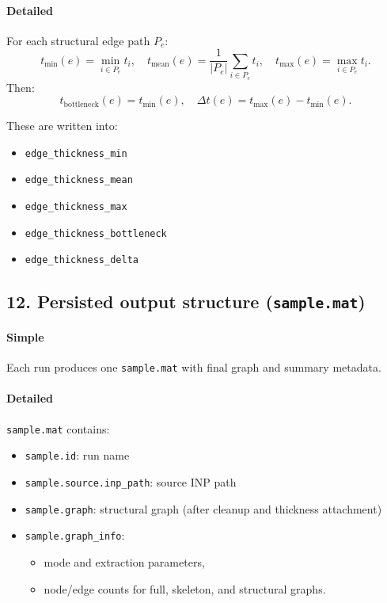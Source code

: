 \documentclass[11pt]{article}
\begin{document}
\paragraph{Detailed}
For each structural edge path \(P_e\):
\[
t_{\min}(e)=\min_{i\in P_e} t_i,\quad
t_{\text{mean}}(e)=\frac{1}{|P_e|}\sum_{i\in P_e} t_i,\quad
t_{\max}(e)=\max_{i\in P_e} t_i.
\]
Then:
\[
t_{\text{bottleneck}}(e)=t_{\min}(e),\quad
\Delta t(e)=t_{\max}(e)-t_{\min}(e).
\]

These are written into:
\begin{itemize}
  \item \texttt{edge\_thickness\_min}
  \item \texttt{edge\_thickness\_mean}
  \item \texttt{edge\_thickness\_max}
  \item \texttt{edge\_thickness\_bottleneck}
  \item \texttt{edge\_thickness\_delta}
\end{itemize}

\subsection*{12. Persisted output structure (\texttt{sample.mat})}
\paragraph{Simple}
Each run produces one \texttt{sample.mat} with final graph and summary metadata.

\paragraph{Detailed}
\texttt{sample.mat} contains:
\begin{itemize}
  \item \texttt{sample.id}: run name
  \item \texttt{sample.source.inp\_path}: source INP path
  \item \texttt{sample.graph}: structural graph (after cleanup and thickness attachment)
  \item \texttt{sample.graph\_info}:
  \begin{itemize}
    \item mode and extraction parameters,
    \item node/edge counts for full, skeleton, and structural graphs.
  \end{itemize}
\end{itemize}
\end{document}
